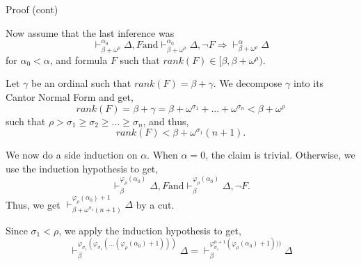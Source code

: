 \documentclass[10pt]{beamer}
\newcommand{\sintcons}[2]{\vdash^{#1}_{#2}}
\begin{document}

\begin{frame}{Proof (cont)}


Now assume that the last inference was
$$
\sintcons{\alpha_0}{\beta+\omega^\rho} \Delta, F \text{and}
\sintcons{\alpha_0}{\beta+\omega^\rho} \Delta, \neg F \Rightarrow
\sintcons{\alpha}{\beta+\omega^\rho}\Delta
$$
for \(\alpha_0 < \alpha\), and formula \(F\) such that \(rank(F) \in [\beta, \beta + \omega^\rho)\).

Let \(\gamma\) be an ordinal such that \(rank(F) = \beta + \gamma\). We decompose
\(\gamma\) into its Cantor Normal Form and get,
$$
rank(F) = \beta + \gamma = \beta + \omega^{\sigma_1} + ... + \omega^{\sigma_n}
< \beta + \omega^\rho
$$
such that \(\rho > \sigma_1 \geq \sigma_2 \geq ... \geq \sigma_n\), and thus,
$$
rank(F) < \beta + \omega^{\sigma_1}(n+1).
$$

We now do a side induction on \(\alpha\). When \(\alpha = 0\), the claim is trivial. Otherwise, we use the induction hypothesis to get,
$$
\sintcons{\varphi_\rho(\alpha_0)}{\beta} \Delta, F \text{and}
\sintcons{\varphi_\rho(\alpha_0)}{\beta} \Delta, \neg F.
$$
Thus, we get \(\sintcons{\varphi_\rho(\alpha_0)+1}{\beta + \omega^{\sigma_1}(n+1)} \Delta\) by a cut.

Since \(\sigma_1 < \rho\), we apply the induction hypothesis to get,
$$
\sintcons{\varphi_{\sigma_1}(\varphi_{\sigma_1}(...(\varphi_{\rho}(\alpha_0)+1)))}{\beta} \Delta =
\sintcons{\varphi_{\sigma_1}^{n+1}(\varphi_{\rho}(\alpha_0)+1)))}{\beta} \Delta
$$

\end{frame}
\end{document}
